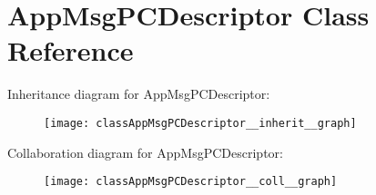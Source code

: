 \hypertarget{classAppMsgPCDescriptor}{}\section{App\+Msg\+P\+C\+Descriptor Class Reference}
\label{classAppMsgPCDescriptor}


Inheritance diagram for App\+Msg\+P\+C\+Descriptor\+:\nopagebreak
\begin{figure}[H]
\begin{center}
\leavevmode
\texttt{[image: classAppMsgPCDescriptor\_\_inherit\_\_graph]}
\end{center}
\end{figure}


Collaboration diagram for App\+Msg\+P\+C\+Descriptor\+:\nopagebreak
\begin{figure}[H]
\begin{center}
\leavevmode
\texttt{[image: classAppMsgPCDescriptor\_\_coll\_\_graph]}
\end{center}
\end{figure}
